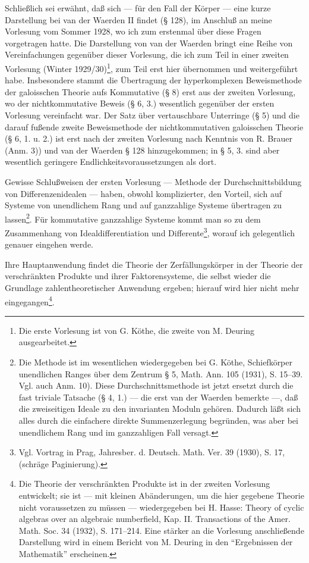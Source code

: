 Schließlich sei erwähnt, daß sich --- für den Fall der Körper --- eine kurze Darstellung bei van der Waerden II findet (§ 128), im Anschluß an meine Vorlesung vom Sommer 1928, wo ich zum erstenmal über diese Fragen vorgetragen hatte. Die Darstellung von van der Waerden bringt eine Reihe von Vereinfachungen gegenüber dieser Vorlesung, die ich zum Teil in einer zweiten Vorlesung (Winter 1929/30)\footnote{Die erste Vorlesung ist von G. Köthe, die zweite von M. Deuring ausgearbeitet.}, zum Teil erst hier übernommen und weitergeführt habe. Insbesondere stammt die Übertragung der hyperkomplexen Beweismethode der galoisschen Theorie aufs Kommutative (§ 8) erst aus der zweiten Vorlesung, wo der nichtkommutative Beweis (§ 6, 3.) wesentlich gegenüber der ersten Vorlesung vereinfacht war. Der Satz über vertauschbare Unterringe (§ 5) und die darauf fußende zweite Beweismethode der nichtkommutativen galoisschen Theorie (§ 6, 1. u. 2.) ist erst nach der zweiten Vorlesung nach Kenntnis von R. Brauer (Anm. 3)) und van der Waerden § 128 hinzugekommen; in § 5, 3. sind aber wesentlich geringere Endlichkeitsvoraussetzungen als dort.

Gewisse Schlußweisen der ersten Vorlesung --- Methode der Durchschnittsbildung von Differenzenidealen --- haben, obwohl komplizierter, den Vorteil, sich auf Systeme von unendlichem Rang und auf ganzzahlige Systeme übertragen zu lassen\footnote{Die Methode ist im wesentlichen wiedergegeben bei G. Köthe, Schiefkörper unendlichen Ranges über dem Zentrum § 5, Math. Ann. 105 (1931), S. 15--39. Vgl. auch Anm. 10). Diese Durchschnittsmethode ist jetzt ersetzt durch die fast triviale Tatsache (§ 4, 1.) --- die erst van der Waerden bemerkte ---, daß die zweiseitigen Ideale zu den invarianten Moduln gehören. Dadurch läßt sich alles durch die einfachere direkte Summenzerlegung begründen, was aber bei unendlichem Rang und im ganzzahligen Fall versagt.}. Für kommutative ganzzahlige Systeme kommt man so zu dem Zusammenhang von Idealdifferentiation und Differente\footnote{Vgl. Vortrag in Prag, Jahresber. d. Deutsch. Math. Ver. 39 (1930), S. 17, (schräge Paginierung).}, worauf ich gelegentlich genauer eingehen werde.

Ihre Hauptanwendung findet die Theorie der Zerfällungskörper in der Theorie der verschränkten Produkte und ihrer Faktorensysteme, die selbst wieder die Grundlage zahlentheoretischer Anwendung ergeben; hierauf wird hier nicht mehr eingegangen\footnote{Die Theorie der verschränkten Produkte ist in der zweiten Vorlesung entwickelt; sie ist --- mit kleinen Abänderungen, um die hier gegebene Theorie nicht voraussetzen zu müssen --- wiedergegeben bei H. Hasse: Theory of cyclic algebras over an algebraic numberfield, Kap. II. Transactions of the Amer. Math. Soc. 34 (1932), S. 171--214. Eine stärker an die Vorlesung anschließende Darstellung wird in einem Bericht von M. Deuring in den ``Ergebnissen der Mathematik'' erscheinen.}.


